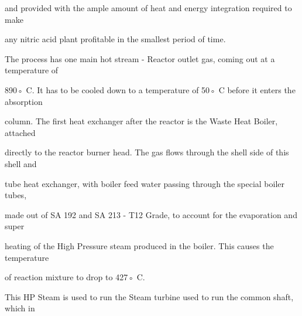 \documentclass[a4paper,portrait,12pt]{article}
\begin{document}
\begin{flushleft}
and provided with the ample amount of heat and energy integration required to make
\end{flushleft}


\begin{flushleft}
any nitric acid plant profitable in the smallest period of time.
\end{flushleft}


\begin{flushleft}
The process has one main hot stream - Reactor outlet gas, coming out at a temperature of
\end{flushleft}


\begin{flushleft}
890◦ C. It has to be cooled down to a temperature of 50◦ C before it enters the absorption
\end{flushleft}


\begin{flushleft}
column. The first heat exchanger after the reactor is the Waste Heat Boiler, attached
\end{flushleft}


\begin{flushleft}
directly to the reactor burner head. The gas flows through the shell side of this shell and
\end{flushleft}


\begin{flushleft}
tube heat exchanger, with boiler feed water passing through the special boiler tubes,
\end{flushleft}


\begin{flushleft}
made out of SA 192 and SA 213 - T12 Grade, to account for the evaporation and super
\end{flushleft}


\begin{flushleft}
heating of the High Pressure steam produced in the boiler. This causes the temperature
\end{flushleft}


\begin{flushleft}
of reaction mixture to drop to 427◦ C.
\end{flushleft}


\begin{flushleft}
This HP Steam is used to run the Steam turbine used to run the common shaft, which in
\end{flushleft}
\end{document}
